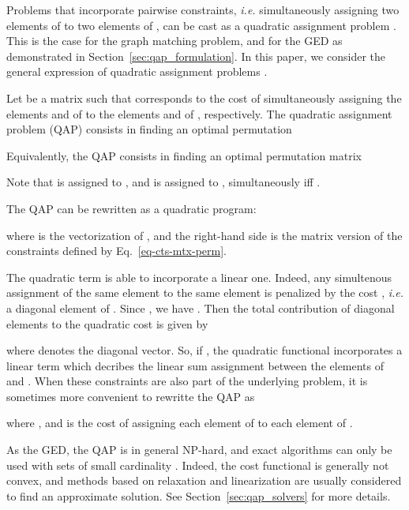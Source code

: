 Problems that incorporate pairwise constraints, \textit{i.e.} simultaneously assigning two elements of  to two elements of , can be cast as a quadratic assignment problem \cite{koop57,Lowler1963,law76,Loiola2007,bur09}. This is the case for the graph matching problem, and for the GED as demonstrated in Section~\ref{sec:qap_formulation}. In this paper, we consider the general expression of quadratic assignment problems \cite{Lowler1963}.
\begin{definition}\label{def:qsap}
Let  be a matrix such that  corresponds to the cost of simultaneously assigning the elements  and  of  to the elements  and  of , respectively. The quadratic assignment problem (QAP) consists in finding an optimal permutation

Equivalently, the QAP consists in finding an optimal  permutation matrix

\end{definition}
Note that  is assigned to , and  is assigned to , simultaneously iff .

The QAP can be rewritten as a quadratic program:

where  is the vectorization of , and the right-hand side is the matrix version of the constraints defined by Eq.~\ref{eq-cts-mtx-perm}.

The quadratic term is able to incorporate a linear one. Indeed, any simultenous assignment of the same element  to the same element  is penalized by the cost , \textit{i.e.} a diagonal element of . Since , we have . Then the total contribution of diagonal elements to the quadratic cost is given by

where  denotes the diagonal vector. So, if , the quadratic functional incorporates a linear term which decribes the linear sum assignment between the elements of  and . When these constraints are also part of the underlying problem, it is sometimes more convenient to rewritte the QAP as

where , and  is the cost of assigning each element of  to each element of .

As the GED, the QAP is in general NP-hard, and exact algorithms can only be used with sets of small cardinality \cite{bur09}. Indeed, the cost functional is generally not convex, and methods based on relaxation and linearization are usually considered to find an approximate solution. See Section~\ref{sec:qap_solvers} for more details.
